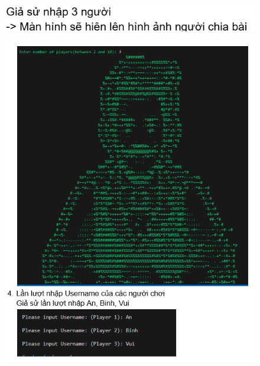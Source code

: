 \documentclass{article}
\begin{document}
    \begin{figure}
        \centering
        \includegraphics[width=1\textwidth]{images/screenshot/4_a_4.png}
    \end{figure}
    \begin{figure}
        \centering
        \includegraphics[width=1\textwidth]{images/screenshot/4_a_5.png}
    \end{figure}
\end{document}
